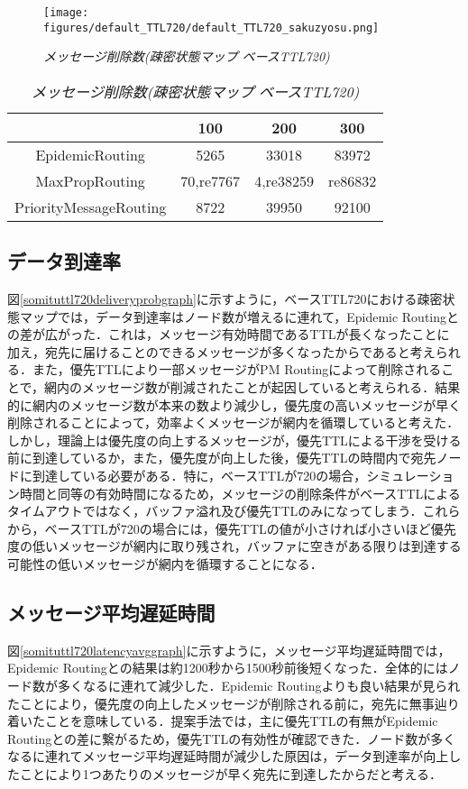 \documentclass[11pt]{icsthesis}
\begin{document}
\begin{figure}[h]
\centering
\texttt{[image: figures/default\_TTL720/default\_TTL720\_sakuzyosu.png]}
\caption[]{\it{メッセージ削除数(疎密状態マップ ベースTTL720)}}
\label{somituttl720droppedgraph}
\end{figure}

\begin{table}[H]
 \begin{center}
      \caption[]{\it{メッセージ削除数(疎密状態マップ ベースTTL720)}}
      \label{somituTtl720dropped}
      \begin{tabular}{|c|c|c|c|}
\hline
&100&200&300\\
\hline
EpidemicRouting&5265&33018&83972\\
\hline
MaxPropRouting&70,re7767&4,re38259&re86832\\
\hline
PriorityMessageRouting&8722&39950&92100\\
\hline
      \end{tabular}
    \end{center}
\end{table}

\subsection{データ到達率}
図\ref{somituttl720deliveryprobgraph}に示すように，ベースTTL720における疎密状態マップでは，データ到達率はノード数が増えるに連れて，Epidemic Routingとの差が広がった．これは，メッセージ有効時間であるTTLが長くなったことに加え，宛先に届けることのできるメッセージが多くなったからであると考えられる．また，優先TTLにより一部メッセージがPM Routingによって削除されることで，網内のメッセージ数が削減されたことが起因していると考えられる．結果的に網内のメッセージ数が本来の数より減少し，優先度の高いメッセージが早く削除されることによって，効率よくメッセージが網内を循環していると考えた．しかし，理論上は優先度の向上するメッセージが，優先TTLによる干渉を受ける前に到達しているか，また，優先度が向上した後，優先TTLの時間内で宛先ノードに到達している必要がある．特に，ベースTTLが720の場合，シミュレーション時間と同等の有効時間になるため，メッセージの削除条件がベースTTLによるタイムアウトではなく，バッファ溢れ及び優先TTLのみになってしまう．これらから，ベースTTLが720の場合には，優先TTLの値が小さければ小さいほど優先度の低いメッセージが網内に取り残され，バッファに空きがある限りは到達する可能性の低いメッセージが網内を循環することになる．

\subsection{メッセージ平均遅延時間}
図\ref{somituttl720latencyavggraph}に示すように，メッセージ平均遅延時間では，Epidemic Routingとの結果は約1200秒から1500秒前後短くなった．全体的にはノード数が多くなるに連れて減少した．Epidemic Routingよりも良い結果が見られたことにより，優先度の向上したメッセージが削除される前に，宛先に無事辿り着いたことを意味している．提案手法では，主に優先TTLの有無がEpidemic Routingとの差に繋がるため，優先TTLの有効性が確認できた．ノード数が多くなるに連れてメッセージ平均遅延時間が減少した原因は，データ到達率が向上したことにより1つあたりのメッセージが早く宛先に到達したからだと考える．
\end{document}
